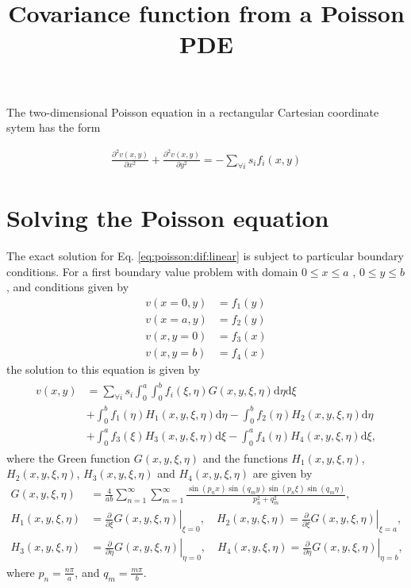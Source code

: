 \documentclass[a4paper,10pt]{article}
\title{Covariance function from a Poisson PDE}
\author{}
\date{}
\newcommand{\dif}{\textrm{d}}
\begin{document}
\maketitle

The two-dimensional Poisson equation in a rectangular Cartesian
coordinate sytem has the form

\begin{align}\label{eq:poisson:dif:linear}
\frac{\partial^2 v(x,y)}{\partial x^2} +  \frac{\partial^2 v(x,y)}{\partial y^2} = -\sum_{\forall i} s_{i}f_i(x,y)
\end{align}

\section{Solving the Poisson equation}

The exact solution for Eq. \eqref{eq:poisson:dif:linear} is subject to
particular boundary conditions. For a first boundary value
problem with domain 
$0\leq x\leq a$ , $0\leq y\leq b$, and conditions given by
\begin{align*}
v(x=0, y) &= f_1(y)\\
v(x=a,y) &= f_2(y) \\
v(x,y=0) &= f_3(x) \\
v(x,y=b) &= f_4(x)
\end{align*}
the solution to this equation is given by \cite{Polyanin:Handbook02}
\begin{align}\label{eq:sol:poisson:dif:linear}
\begin{split}
v(x,y)&=\sum_{\forall i}s_{i} \int_{0}^{a}\int_{0}^{b}f_i(\xi,\eta)G(x, y,\xi,\eta)\dif{\eta}\dif{\xi}\\
      &+ \int_0^bf_1(\eta)H_1(x, y, \xi, \eta)\dif\eta
      -\int_0^bf_2(\eta)H_2(x, y, \xi, \eta)\dif\eta \\
 &+ \int_0^af_3(\xi)H_3(x, y, \xi, \eta)\dif\xi -\int_0^af_4(\eta)H_4(x, y, \xi, \eta)\dif\xi,
\end{split}
\end{align}
where the Green function $G(x, y,\xi,\eta)$ and the functions $H_1(x,
y,\xi,\eta)$, $H_2(x, y,\xi,\eta)$, $H_3(x, y,\xi,\eta)$ and $H_4(x, y,\xi,\eta)$ are given by
\begin{align}\label{eq:green:function}
G(x, y,\xi,\eta)&=\frac{4}{ab}\sum_{n=1}^\infty
                  \sum_{m=1}^\infty\frac{\sin\left({p_n x}\right)
\sin\left(q_m y\right)\sin\left(p_n \xi\right)\sin\left(q_m \eta\right)}{p_n^2 + q_m^2},\\
H_1(x, y,\xi,\eta)& =
                         \left.\frac{\partial}{\partial\xi}G(x, y, \xi,\eta)\right|_{\xi=0},\quad 
H_2(x, y,\xi,\eta) = \left.\frac{\partial}{\partial\xi}G(x, y,
                    \xi,\eta)\right|_{\xi=a}\nonumber,\\
H_3(x, y,\xi,\eta)& =
                         \left.\frac{\partial}{\partial\eta}G(x, y, \xi,\eta)\right|_{\eta=0},\quad 
H_4(x, y,\xi,\eta) = \left.\frac{\partial}{\partial\eta}G(x, y, \xi,\eta)\right|_{\eta=b}\nonumber,
\end{align}
where $p_n=\frac{n\pi}{a}$, and $q_m=\frac{m\pi}{b}$.
\end{document}
